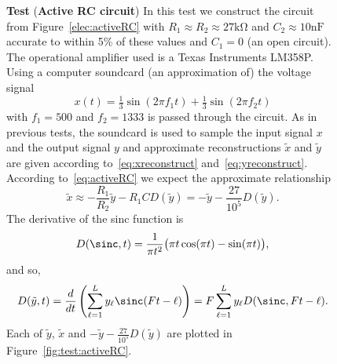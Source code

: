 \documentclass[11pt,a4paper]{book}
\theoremstyle{plain}
\numberwithin{equation}{section}
\newcounter{test}
\newenvironment{test}{
\begin{shaded}\refstepcounter{test}\par\noindent%
\textbf{Test \thetest}
}{
\end{shaded}
}
\newenvironment{randomfloat}{
\begin{figure}
}{
\end{figure}
\addtocounter{figure}{-1}
}
\begin{document}
\begin{randomfloat}
\begin{test}\label{test:activeRCtest} 
(\textbf{Active RC circuit})
In this test we construct the circuit from Figure~\ref{elec:activeRC} with $R_1 \approx R_2 \approx 27\si{\kilo\ohm}$ and $C_2 \approx 10\si{\nano\farad}$ accurate to within 5\%  of these values and  $C_1 = 0$ (an open circuit).  The operational amplifier used is a Texas Instruments LM358P.  Using a computer soundcard (an approximation of) the voltage signal
\[
x(t) = \tfrac{1}{3}\sin( 2 \pi f_1 t) + \tfrac{1}{3}\sin( 2\pi f_2 t)
\]
with $f_1 = 500$ and $f_2 = 1333$ is passed through the circuit.  As in previous tests, the soundcard is used to sample the input signal $x$ and the output signal $y$ and approximate reconstructions $\tilde{x}$ and $\tilde{y}$ are given according to~\eqref{eq:xreconstruct} and~\eqref{eq:yreconstruct}.  According to~\eqref{eq:activeRC} we expect the approximate relationship
\[
\tilde{x} \approx -\frac{R_1}{R_2}\tilde{y} - R_1 C D(\tilde{y}) = - \tilde{y} - \frac{27}{10^5} D(\tilde{y}).
\]
The derivative of the sinc function is
\begin{equation}\label{eq:sincderivative}
D(\sinc,t) = \frac{1}{\pi t^2} \big( \pi t \cos(\pi t) - \sin(\pi t) \big),
\end{equation}
and so,
\begin{equation}\label{eq:Dtildey}
D(\tilde{y},t) = \frac{d}{dt}\left(\sum_{\ell=1}^L y_\ell \sinc(F t - \ell) \right) = F \sum_{\ell=1}^L y_\ell D(\sinc,F t -\ell).
\end{equation}
Each of $\tilde{y}$, $\tilde{x}$ and $-\tilde{y} - \tfrac{27}{10^5} D(\tilde{y})$ are plotted in Figure~\ref{fig:test:activeRC}. 


\end{test}
\end{randomfloat}
\end{document}
